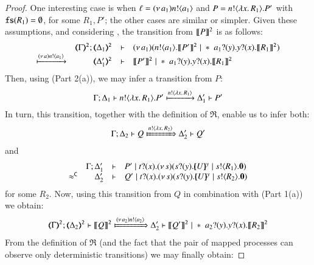 \begin{proof}
\smallskip

One interesting case is when $\ell = (\nu\, a_1)n ! \langle a_1 \rangle$ and 
$P = n ! \langle \lambda x.\,R_1 \rangle . P'$ with {$\mathtt{fs}(R_1) = \emptyset$}, for some $R_1, P'$; the other cases are similar or simpler. 
Given these assumptions, and considering , the transition from $\llbracket P\rrbracket^{2}$ is as follows:
%
$$
	\mhorel	{\tmap{\Gamma}{2}}
		{\tmap{\Delta_1}{2}}
		{\news{a_1}(\bout{n}{a_1} \pmap{P'}{2} \Par \repl{\binp{a_1}{y} \binp{y}{x} \pmap{R_1}{2}})}
		{\hby{\news{a}\bactout{n}{a_1}}}
		{\tmap{\Delta_1'}{2}}
		{}
		{\pmap{P'}{2} \Par \repl{\binp{a_1}{y} \binp{y}{x} \pmap{R_1}{2}}}
$$
Then, using 
 (Part 2(a)), 
we may infer a transition from $P$:
$$\Gamma; \Delta_1 \vdash n ! \langle \lambda x.\,R_1 \rangle . P'
		\xmapsto{n !\langle \lambda x.\,R_1 \rangle}
		\Delta_1' \vdash P'$$
In turn, this transition, together with the definition of 
$\Re$, enable us to infer both:
	\begin{eqnarray*}
		\Gamma; \Delta_2 \proves Q
		\Hby{\bactout{n}{\abs{x}{R_2}}}
		\Delta_2' \proves Q'
	\end{eqnarray*}
	and
	$$
	\mhorel
		{\Gamma}
		{\Delta_1'}
		{P' \Par \binp{t}{x} \newsp{s}{ \binp{s}{y} \mapchar{U}{y} \Par \bout{s}{R_1} \inact }}
		{\fwb}
		{\Delta_2'} 
		{}
		{Q' \Par \binp{t}{x} \newsp{s}{ \binp{s}{y} \mapchar{U}{y} \Par \bout{s}{R_2} \inact }}
$$
for some $R_2$.
	Now, using this transition from $Q$ in combination with  (Part 1(a)) we obtain:
%	
	\begin{eqnarray*}
		\tmap{\Gamma}{2};   \tmap{\Delta_2}{2} \proves \pmap{Q}{2}
		\Hby{\news{a_2}\bactout{n}{a_2}}
		\Delta_2' \proves \pmap{Q'}{2} \Par \repl{\binp{a_2}{y} \binp{y}{x} \pmap{R_2}{2}}
	\end{eqnarray*}
From the definition of $\Re$ (and the fact that the pair
	of mapped processes can observe only deterministic transitions) we may finally obtain:


\end{proof}
